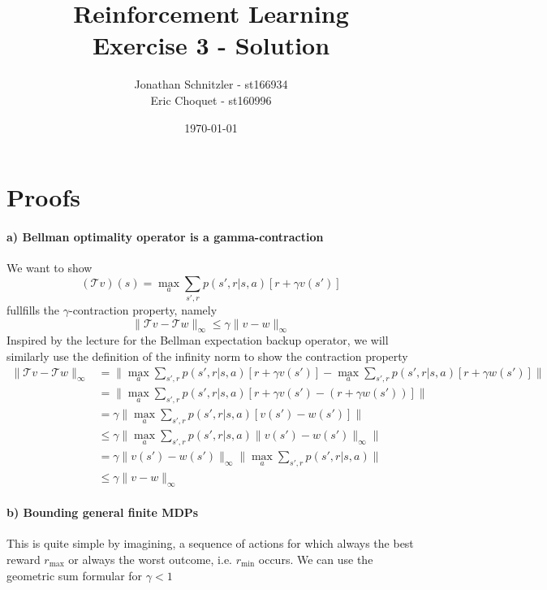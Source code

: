 \documentclass{article}
\title{Reinforcement Learning \\ Exercise 3 - Solution}
\author{Jonathan Schnitzler - st166934 \\
Eric Choquet - st160996}
\date{\today}
\begin{document}
\maketitle
\section*{Proofs}

\paragraph*{a) Bellman optimality operator is a gamma-contraction}
We want to show
\begin{equation}
    (\mathcal{T}v)(s) = \max_a \sum_{s', r} p(s', r|s,a)[r + \gamma v(s')]
\end{equation}
fullfills the $\gamma$-contraction property, namely
\begin{equation}
    \|\mathcal{T}v - \mathcal{T}w\|_\infty \leq \gamma \|v - w\|_\infty
\end{equation}
Inspired by the lecture for the Bellman expectation backup operator, we will similarly use the definition of the infinity norm to show the contraction property
\begin{align}
    \|\mathcal{T}v - \mathcal{T}w\|_\infty &= \| \max_a \sum_{s', r} p(s', r|s,a)[r + \gamma v(s')] - \max_a \sum_{s', r} p(s', r|s,a)[r + \gamma w(s')] \| \\
    &= \| \max_a \sum_{s', r} p(s', r|s,a)[r + \gamma v(s') - (r + \gamma w(s'))] \| \\
    &=\gamma \| \max_a \sum_{s', r} p(s', r|s,a) [v(s') - w(s')] \| \\
    &\leq \gamma \| \max_a \sum_{s', r} p(s', r|s,a) \|v(s') - w(s')\|_\infty \| \\
    &= \gamma \|v(s') - w(s')\|_\infty \| \max_a \sum_{s', r} p(s', r|s,a)  \| \\
    &\leq \gamma \|v - w\|_\infty
\end{align}

\paragraph*{b) Bounding general finite MDPs}
This is quite simple by imagining, a sequence of actions for which always the best reward $r_{\text{max}}$ or always the worst outcome, i.e. $r_{\text{min}}$ occurs. We can use the geometric sum formular for $\gamma < 1$
\end{document}
